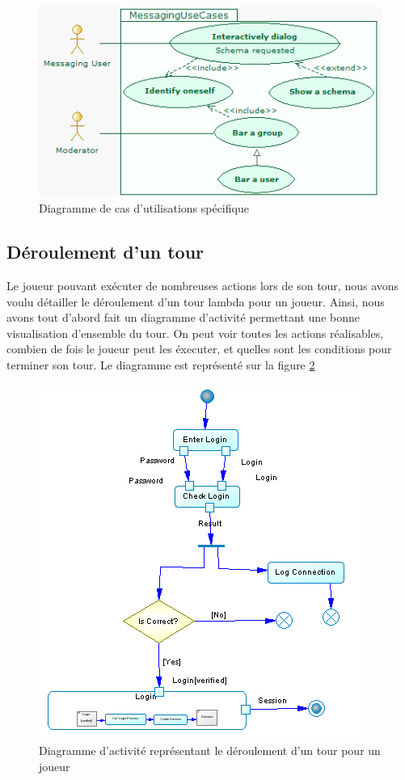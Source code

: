 \begin{figure}[!h] 
\centerline{\includegraphics[scale=0.7]{img/diag_cas_dut2_ex.jpeg}}
   \caption{\label{étiquette} Diagramme de cas d'utilisations spécifique}
\label{casdut2}
\end{figure}

\subsection{Déroulement d'un tour}
Le joueur pouvant exécuter de nombreuses actions lors de son tour, nous avons voulu détailler le déroulement d'un tour lambda pour un joueur. Ainsi, nous avons tout d'abord fait un diagramme d'activité permettant une bonne visualisation d'ensemble du tour. On peut voir toutes les actions réalisables, combien de fois le joueur peut les éxecuter, et quelles sont les conditions pour terminer son tour. Le diagramme est représenté sur la figure \ref{activiteTour}

\begin{figure}[!h] 
\centerline{\includegraphics[scale=0.30]{img/activite_tour_ex.png}}
   \caption{\label{étiquette} Diagramme d'activité représentant le déroulement d'un tour pour un joueur}
\label{activiteTour}
\end{figure}

